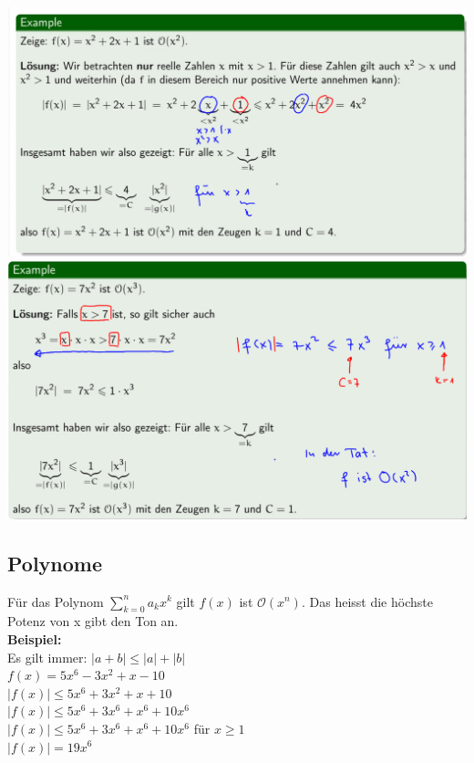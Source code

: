 \documentclass[12pt]{scrartcl}
\begin{document}
\includegraphics[width=15cm]{img/wachstum_example_1.png}
\newpage
\includegraphics[width=15cm]{img/wachstum_example_2.png}


\subsection{Polynome}
Für das Polynom $\sum_{k=0}^n a_k x^k$ gilt $f(x)$ ist $\mathcal{O}(x^n)$. Das heisst
die höchste Potenz von x gibt den Ton an.\\

\textbf{Beispiel:}\\
Es gilt immer: $|a + b| \leq |a| + |b|$\\

$f(x) = 5x^6 - 3x^2 + x - 10$\\
$|f(x)| \leqslant 5x^6 + 3x^2 + x + 10$\\
$|f(x)| \leqslant 5x^6 + 3x^6 + x^6 + 10x^6$\\
$|f(x)| \leqslant 5x^6 + 3x^6 + x^6 + 10x^6$ für $x \geqslant 1$\\
$|f(x)| = 19x^6$\\
\end{document}
